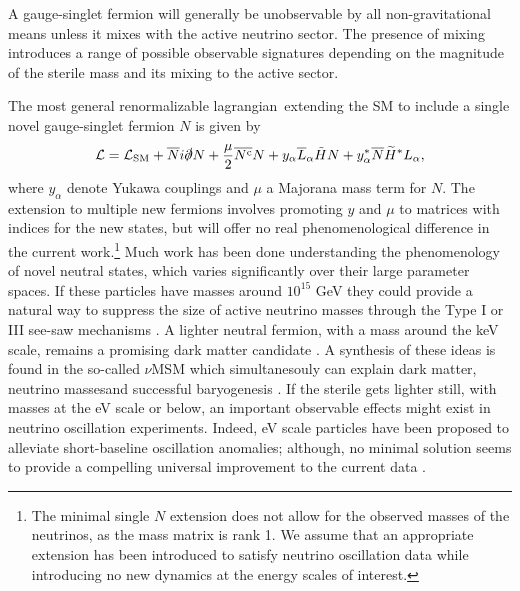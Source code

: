 \documentclass[11pt, a4paper]{article}
\def\lagrangian{lagrangian}
\begin{document}
A gauge-singlet fermion will generally be unobservable by all non-gravitational
means unless it mixes with the active neutrino sector. The presence of mixing
introduces a range of possible observable signatures depending on the magnitude
of the sterile mass and its mixing to the active sector. 

The most general renormalizable \lagrangian\ extending the SM to include a
single novel gauge-singlet fermion $N$ is given by
%
\begin{align}   \mathcal{L} = \mathcal{L}_\text{SM} +
\overline{N}i\slashed{\partial}N+ \frac{\mu}{2} \overline{N^\text{c}}N  +
y_\alpha\overline{L}_\alpha\tilde{H} N + y_\alpha^*
\overline{N}\widetilde{H}^*L_\alpha,\label{eq:minimallag} \end{align}
%
where $y_\alpha$ denote Yukawa couplings and $\mu$ a Majorana mass term for
$N$. The extension to multiple new fermions involves promoting $y$ and $\mu$ to
matrices with indices for the new states, but will offer no real
phenomenological difference in the current work.\footnote{The minimal single
$N$ extension does not allow for the observed masses of the neutrinos, as the
mass matrix is rank 1. We assume that an appropriate extension has been
introduced to satisfy neutrino oscillation data while introducing no new
dynamics at the energy scales of interest.} Much work has been done
understanding the phenomenology of novel neutral states, which varies
significantly over their large parameter spaces. 
%
If these particles have masses around $10^{15}$ GeV they could provide a
natural way to suppress the size of active neutrino masses through the Type I
or III see-saw mechanisms \cite{Minkowski:1977sc, GellMann:1980vs,
Mohapatra:1979ia}. A lighter neutral fermion, with a mass around the keV scale,
remains a promising dark matter candidate \cite{Adhikari:2016bei}. A synthesis
of these ideas is found in the so-called $\nu$MSM which simultanesouly can
explain dark matter, neutrino massesand successful baryogenesis
\cite{Asaka:2005pn}. 
%
If the sterile gets lighter still, with masses at the eV scale or below, an
important observable effects might exist in neutrino oscillation experiments.
Indeed, eV scale particles have been proposed to alleviate short-baseline
oscillation anomalies; although, no minimal solution seems to provide a
compelling universal improvement to the current data \cite{Kopp:2013vaa}. 
%
\end{document}

